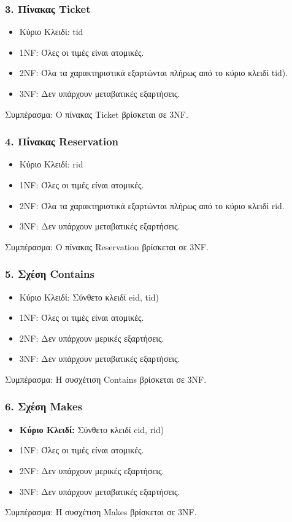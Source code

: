 \documentclass[a4paper, 11pt]{article}
\begin{document}
\subsubsection*{3. Πίνακας Ticket}
\begin{itemize}
    \item Κύριο Κλειδί: tid
    \item 1NF: Όλες οι τιμές είναι ατομικές.
    \item 2NF: Όλα τα χαρακτηριστικά εξαρτώνται πλήρως από το κύριο κλειδί tid).
    \item 3NF: Δεν υπάρχουν μεταβατικές εξαρτήσεις.
\end{itemize}
Συμπέρασμα: Ο πίνακας Ticket βρίσκεται σε 3NF.

\subsubsection*{4. Πίνακας Reservation}
\begin{itemize}
    \item Κύριο Κλειδί: rid
    \item 1NF: Όλες οι τιμές είναι ατομικές.
    \item 2NF: Όλα τα χαρακτηριστικά εξαρτώνται πλήρως από το κύριο κλειδί rid.
    \item 3NF: Δεν υπάρχουν μεταβατικές εξαρτήσεις.
\end{itemize}
Συμπέρασμα: Ο πίνακας Reservation βρίσκεται σε 3NF.

\subsubsection*{5. Σχέση Contains}
\begin{itemize}
    \item Κύριο Κλειδί: Σύνθετο κλειδί eid, tid)
    \item 1NF: Όλες οι τιμές είναι ατομικές.
    \item 2NF: Δεν υπάρχουν μερικές εξαρτήσεις.
    \item 3NF: Δεν υπάρχουν μεταβατικές εξαρτήσεις.
\end{itemize}
Συμπέρασμα: Η συσχέτιση Contains βρίσκεται σε 3NF.

\subsubsection*{6. Σχέση Makes}
\begin{itemize}
    \item \textbf{Κύριο Κλειδί:} Σύνθετο κλειδί cid, rid)
    \item 1NF: Όλες οι τιμές είναι ατομικές.
    \item 2NF: Δεν υπάρχουν μερικές εξαρτήσεις.
    \item 3NF: Δεν υπάρχουν μεταβατικές εξαρτήσεις.
\end{itemize}
Συμπέρασμα: Η συσχέτιση Makes βρίσκεται σε 3NF.
\end{document}
